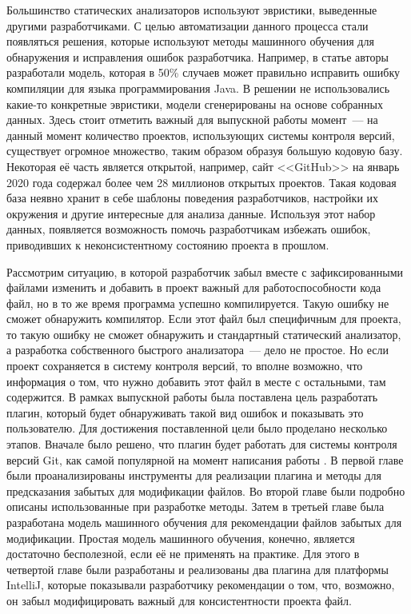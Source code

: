 Большинство статических анализаторов используют эвристики, выведенные другими разработчиками. С целью автоматизации данного процесса стали появляться решения, которые используют методы машинного обучения для обнаружения и исправления ошибок разработчика. Например, в статье \cite{static-analysis-ml} авторы разработали модель, которая в 50\% случаев может правильно исправить ошибку компиляции для языка программирования Java. В решении не использовались какие-то конкретные эвристики, модели сгенерированы на основе собранных данных. Здесь стоит отметить важный для выпускной работы момент~--- на данный момент количество проектов, использующих системы контроля версий, существует огромное множество, таким образом образуя большую кодовую базу. Некоторая её часть является открытой, например, сайт <<GitHub>> на январь 2020 года содержал более чем 28 миллионов открытых проектов. Такая кодовая база неявно хранит в себе шаблоны поведения разработчиков, настройки их окружения и другие интересные для анализа данные. Используя этот набор данных, появляется возможность помочь разработчикам избежать ошибок, приводивших к неконсистентному состоянию проекта в прошлом.

Рассмотрим ситуацию, в которой разработчик забыл вместе с зафиксированными файлами изменить и добавить в проект важный для работоспособности кода файл, но в то же время программа успешно компилируется. Такую ошибку не сможет обнаружить компилятор. Если этот файл был специфичным для проекта, то такую ошибку не сможет обнаружить и стандартный статический анализатор, а разработка собственного быстрого анализатора~--- дело не простое. Но если проект сохраняется в систему контроля версий, то вполне возможно, что информация о том, что нужно добавить этот файл в месте с остальными, там содержится. В рамках выпускной работы была поставлена цель разработать плагин, который будет обнаруживать такой вид ошибок и показывать это пользователю. Для достижения поставленной цели было проделано несколько этапов. Вначале было решено, что плагин будет работать для системы контроля версий Git, как самой популярной на момент написания работы \cite{best-vcs}. В первой главе были проанализированы инструменты для реализации плагина и методы для предсказания забытых для модификации файлов. Во второй главе были подробно описаны использованные при разработке методы. Затем в третьей главе была разработана модель машинного обучения для рекомендации файлов забытых для модификации. Простая модель машинного обучения, конечно, является достаточно бесполезной, если её не применять на практике. Для этого в четвертой главе были разработаны и реализованы два плагина для платформы IntelliJ, которые показывали разработчику рекомендации о том, что, возможно, он забыл модифицировать важный для консистентности проекта файл.